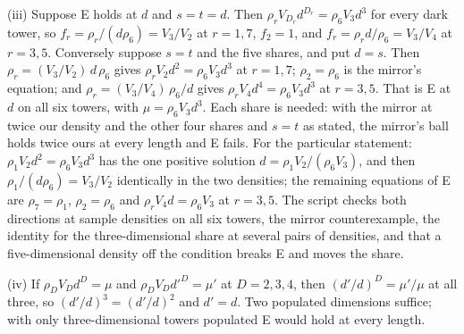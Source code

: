 (iii) Suppose E holds at $d$ and $s = t = d$. Then $\rho_{r}V_{D_{r}}d^{D_{r}} = \rho_{6}V_{3}d^{3}$ for every dark tower, so $f_{r} = \rho_{r}/(d\rho_{6}) = V_{3}/V_{2}$ at $r = 1, 7$, $f_{2} = 1$, and $f_{r} = \rho_{r}d/\rho_{6} = V_{3}/V_{4}$ at $r = 3, 5$. Conversely suppose $s = t$ and the five shares, and put $d = s$. Then $\rho_{r} = (V_{3}/V_{2})\,d\,\rho_{6}$ gives $\rho_{r}V_{2}d^{2} = \rho_{6}V_{3}d^{3}$ at $r = 1, 7$; $\rho_{2} = \rho_{6}$ is the mirror's equation; and $\rho_{r} = (V_{3}/V_{4})\,\rho_{6}/d$ gives $\rho_{r}V_{4}d^{4} = \rho_{6}V_{3}d^{3}$ at $r = 3, 5$. That is E at $d$ on all six towers, with $\mu = \rho_{6}V_{3}d^{3}$. Each share is needed: with the mirror at twice our density and the other four shares and $s = t$ as stated, the mirror's ball holds twice ours at every length and E fails. For the particular statement: $\rho_{1}V_{2}d^{2} = \rho_{6}V_{3}d^{3}$ has the one positive solution $d = \rho_{1}V_{2}/(\rho_{6}V_{3})$, and then $\rho_{1}/(d\rho_{6}) = V_{3}/V_{2}$ identically in the two densities; the remaining equations of E are $\rho_{7} = \rho_{1}$, $\rho_{2} = \rho_{6}$ and $\rho_{r}V_{4}d = \rho_{6}V_{3}$ at $r = 3, 5$. The script checks both directions at sample densities on all six towers, the mirror counterexample, the identity for the three-dimensional share at several pairs of densities, and that a five-dimensional density off the condition breaks E and moves the share.

(iv) If $\rho_{D}V_{D}d^{D} = \mu$ and $\rho_{D}V_{D}d'^{D} = \mu'$ at $D = 2, 3, 4$, then $(d'/d)^{D} = \mu'/\mu$ at all three, so $(d'/d)^{3} = (d'/d)^{2}$ and $d' = d$. Two populated dimensions suffice; with only three-dimensional towers populated E would hold at every length.
